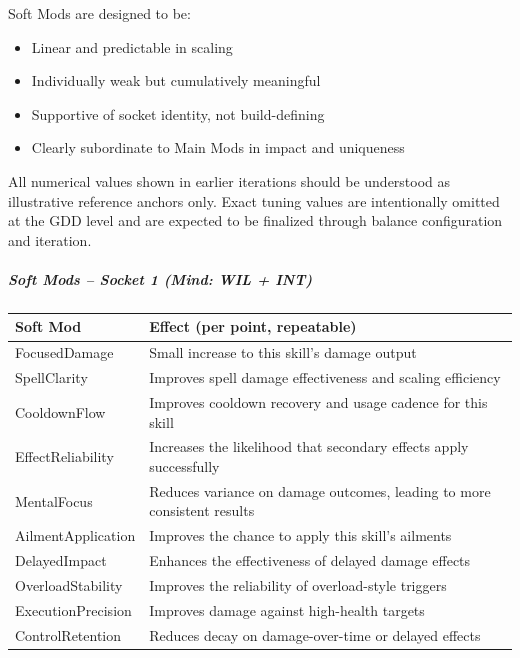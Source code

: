 Soft Mods are designed to be:
\begin{itemize}
	\item Linear and predictable in scaling
	\item Individually weak but cumulatively meaningful
	\item Supportive of socket identity, not build-defining
	\item Clearly subordinate to Main Mods in impact and uniqueness
\end{itemize}

All numerical values shown in earlier iterations should be understood as illustrative reference anchors only. 
Exact tuning values are intentionally omitted at the GDD level and are expected to be finalized through balance configuration and iteration.

\subparagraph{Soft Mods – Socket 1 (Mind: WIL + INT)}

\begin{tabular}{l|p{9.5cm}}
	\textbf{Soft Mod} & \textbf{Effect (per point, repeatable)} \\ \hline
	FocusedDamage &	Small increase to this skill’s damage output \\
	SpellClarity &	Improves spell damage effectiveness and scaling efficiency \\
	CooldownFlow &	Improves cooldown recovery and usage cadence for this skill \\
	EffectReliability &	Increases the likelihood that secondary effects apply successfully \\
	MentalFocus &	Reduces variance on damage outcomes, leading to more consistent results \\
	AilmentApplication &	Improves the chance to apply this skill’s ailments \\
	DelayedImpact &	Enhances the effectiveness of delayed damage effects \\
	OverloadStability &	Improves the reliability of overload-style triggers \\
	ExecutionPrecision &	Improves damage against high-health targets \\
	ControlRetention &	Reduces decay on damage-over-time or delayed effects \\
\end{tabular}

